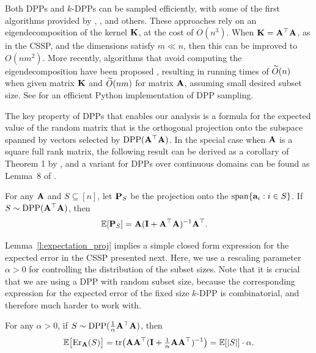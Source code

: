 \documentclass{article}
\begin{document}
Both DPPs and $k$-DPPs can be sampled efficiently, with some of the
first algorithms provided by
\citet{dpp-independence},
\citet{efficient-volume-sampling}, \citet{k-dpp} and others. These
approaches rely on an eigendecomposition of the kernel $\K$, at the cost of $O(n^3)$. When
$\K=\A^\top\A$, as in the CSSP, and the dimensions satisfy $m\ll n$, then this can be improved
to $O(nm^2)$. More recently, algorithms that avoid computing the
eigendecomposition have been proposed
\citep{dpp-intermediate,dpp-sublinear,alpha-dpp,rayleigh-mcmc},
resulting in running times of $\Ot(n)$ when given matrix $\K$ and
$\Ot(nm)$ for matrix $\A$, assuming small desired subset size.
See \citet{dppy} for an efficient Python implementation of DPP sampling.

The key property of DPPs that enables our analysis is a
formula for the expected value of the random matrix that is the orthogonal projection onto the
subspace spanned by vectors selected by $\DPP(\A^\top\A)$.
In the special case when $\A$ is a square full rank matrix, the
following result can be derived as a corollary of Theorem 1 by
\citet{randomized-newton}, and a variant for DPPs over
continuous domains can be found as Lemma~8 of
\citet{surrogate-design}. 
\begin{lemma}\label{l:expectation_proj}
  For any $\A$ and $S\subseteq [n]$, let $\P_S$ be the  
projection onto the $\mathrm{span}\{\a_i:i\in S\}$. If $S\sim \DPP(\A^\top\A)$, then
\begin{align*}
  \E[\P_S] & = \A(\I+\A^\top\A)^{-1}\A^\top.
\end{align*}
\end{lemma}
Lemma~\ref{l:expectation_proj} implies a simple closed form expression for
the expected error in the CSSP presented next. Here, we use a
rescaling parameter $\alpha>0$ for controlling
the distribution of the subset sizes. Note that it is crucial that we
are using a DPP with random subset size, because the corresponding
expression for the expected error of the fixed size $k$-DPP is
combinatorial, and therefore much harder to work with.
\begin{lemma}\label{l:expected-error}
  For any $\alpha>0$, if $S\sim
  \DPP(\frac1\alpha\A^\top\A)$, then
  \begin{align*}
    \E\big[\Er_\A(S)\big] =
    \tr\big(\A\A^\top(\I+\tfrac1\alpha\A\A^\top)^{-1}\big) = \E[|S|]\cdot\alpha.
  \end{align*}
\end{lemma}
\end{document}
